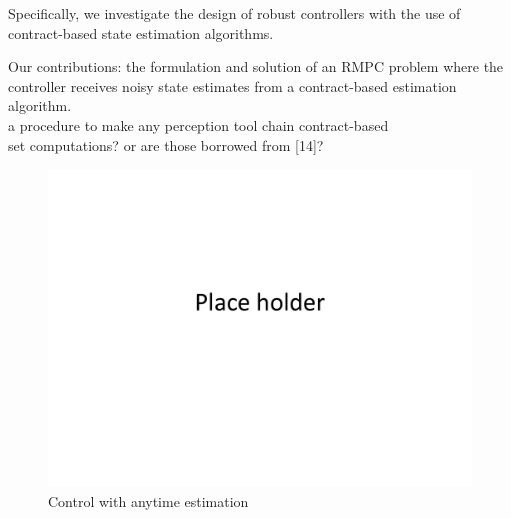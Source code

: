 Specifically, we investigate the design of robust controllers with the use of contract-based state estimation algorithms.

Our contributions: 
the formulation and solution of an RMPC problem where the controller receives noisy state estimates from a contract-based estimation algorithm.
\\
a procedure to make any perception tool chain contract-based 
\\
set computations? or are those borrowed from [14]?


\begin{figure}[t]
	\centering
	\includegraphics[width=0.7\linewidth]{figures/placeHolder}
	\caption{Control with anytime estimation}
	\label{fig:feedbackloop}
\end{figure}

